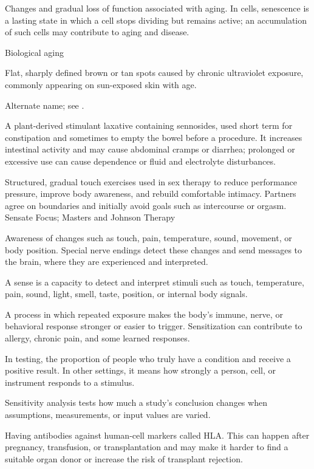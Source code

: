  Changes and gradual loss of function associated with aging. In cells, senescence is a lasting state in which a cell stops dividing but remains active; an accumulation of such cells may contribute to aging and disease.

\synonyms
Biological aging

 Flat, sharply defined brown or tan spots caused by chronic ultraviolet exposure, commonly appearing on sun-exposed skin with age.

 Alternate name; see .

 A plant-derived stimulant laxative containing sennosides, used short term for constipation and sometimes to empty the bowel before a procedure. It increases intestinal activity and may cause abdominal cramps or diarrhea; prolonged or excessive use can cause dependence or fluid and electrolyte disturbances.

 Structured, gradual touch exercises used in sex therapy to reduce performance pressure, improve body awareness, and rebuild comfortable intimacy. Partners agree on boundaries and initially avoid goals such as intercourse or orgasm.
\synonyms
Sensate Focus; Masters and Johnson Therapy

 Awareness of changes such as touch, pain, temperature, sound, movement, or body position. Special nerve endings detect these changes and send messages to the brain, where they are experienced and interpreted.

 A sense is a capacity to detect and interpret stimuli such as touch, temperature, pain, sound, light, smell, taste, position, or internal body signals.

 A process in which repeated exposure makes the body’s immune, nerve, or behavioral response stronger or easier to trigger. Sensitization can contribute to allergy, chronic pain, and some learned responses.

 In testing, the proportion of people who truly have a condition and receive a positive result. In other settings, it means how strongly a person, cell, or instrument responds to a stimulus.

 Sensitivity analysis tests how much a study's conclusion changes when assumptions, measurements, or input values are varied.

 Having antibodies against human-cell markers called HLA. This can happen after pregnancy, transfusion, or transplantation and may make it harder to find a suitable organ donor or increase the risk of transplant rejection.

